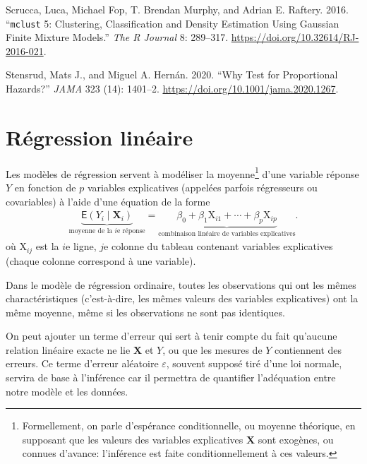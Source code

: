 \documentclass[
  11pt,
  letterpaper,
]{scrbook}
\newlength{\cslhangindent}
\newlength{\cslentryspacingunit} %
\newenvironment{CSLReferences}[2] %
 {%
  \setlength{\parindent}{0pt}
  \ifodd #1
  \let\oldpar\par
  \def\par{\hangindent=\cslhangindent\oldpar}
  \fi
  \setlength{\parskip}{#2\cslentryspacingunit}
 }%
 {}
\theoremstyle{definition}
\theoremstyle{remark}
\begin{document}
\begin{CSLReferences}{1}{0}
\leavevmode{}%
Scrucca, Luca, Michael Fop, T. Brendan Murphy, and Adrian E. Raftery.
2016. {``\texttt{mclust} 5: Clustering, Classification and Density
Estimation Using {G}aussian Finite Mixture Models.''} \emph{The R
Journal} 8: 289--317. \url{https://doi.org/10.32614/RJ-2016-021}.

\leavevmode{}%
Stensrud, Mats J., and Miguel A. Hernán. 2020. {``{Why Test for
Proportional Hazards?}''} \emph{JAMA} 323 (14): 1401--2.
\url{https://doi.org/10.1001/jama.2020.1267}.

\end{CSLReferences}


\hypertarget{regression-lineaire}{%
\chapter{Régression linéaire}\label{regression-lineaire}}

Les modèles de régression servent à modéliser la moyenne\footnote{Formellement,
  on parle d'espérance conditionnelle, ou moyenne théorique, en
  supposant que les valeurs des variables explicatives \(\mathbf{X}\)
  sont exogènes, ou connues d'avance: l'inférence est faite
  conditionnellement à ces valeurs.} d'une variable réponse \(Y\) en
fonction de \(p\) variables explicatives (appelées parfois régresseurs
ou covariables) à l'aide d'une équation de la forme \begin{align*}
\underbrace{\mathsf{E}(Y_i \mid \mathbf{X}_i)}_{\text{moyenne de la $i$e réponse}}=\underbrace{\beta_0 + \beta_1\mathrm{X}_{i1} + \cdots + \beta_p \mathrm{X}_{ip}}_{\text{combinaison linéaire de variables explicatives}}.
\end{align*} où \(\mathrm{X}_{ij}\) est la \(i\)e ligne, \(j\)e colonne
du tableau contenant variables explicatives (chaque colonne correspond à
une variable).

Dans le modèle de régression ordinaire, toutes les observations qui ont
les mêmes charactéristiques (c'est-à-dire, les mêmes valeurs des
variables explicatives) ont la même moyenne, même si les observations ne
sont pas identiques.

On peut ajouter un terme d'erreur qui sert à tenir compte du fait
qu'aucune relation linéaire exacte ne lie \(\mathbf{X}\) et \(Y\), ou
que les mesures de \(Y\) contiennent des erreurs. Ce terme d'erreur
aléatoire \(\varepsilon\), souvent supposé tiré d'une loi normale,
servira de base à l'inférence car il permettra de quantifier
l'adéquation entre notre modèle et les données.
\end{document}
